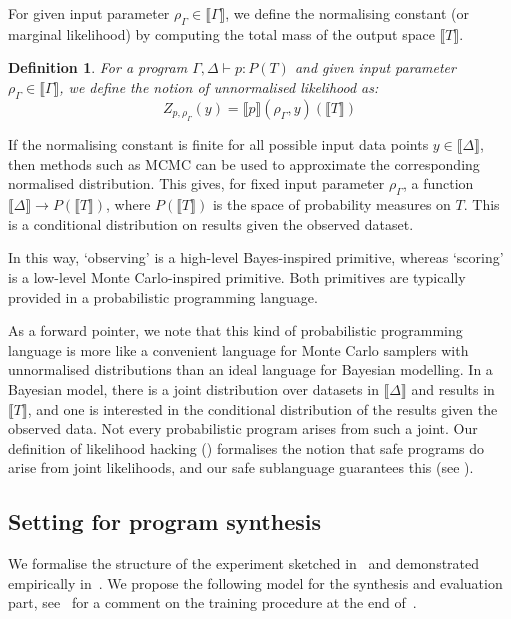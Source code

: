 \documentclass[preprint]{uai2026} %
\newtheorem{definition}{Definition}
\newcommand{\sem}[1]{\llbracket #1 \rrbracket}
\begin{document}
For given input parameter $\rho_\Gamma\in \sem{\Gamma}$, we define the normalising constant (or marginal likelihood) by computing the total mass of the output space $\sem{T}$.

\begin{definition}\label{def:Z}
For a program $\Gamma, \Delta \vdash p: P(T)$ and given input parameter $\rho_\Gamma \in \sem{\Gamma}$, we define the notion of unnormalised likelihood as:
\[
Z_{p, \rho_\Gamma}(y) = \sem{p}(\rho_\Gamma, y)(\sem{T})
\]
\end{definition}

If the normalising constant is finite for all possible input data points $y\in\sem{\Delta}$, then methods such as MCMC can be used to approximate the corresponding normalised distribution. 
This gives, for fixed input parameter $\rho_\Gamma$, a function $\sem{\Delta}\to P(\sem{T})$, where $P(\sem{T})$ is the space of probability measures on $T$. This is a conditional distribution on results given the observed dataset. 


In this way, `observing' is a high-level Bayes-inspired primitive, whereas `scoring' is a low-level Monte Carlo-inspired primitive. Both primitives are typically provided in a probabilistic programming language. 


As a forward pointer, we note that this kind of probabilistic programming language is more like a convenient language for Monte Carlo samplers with unnormalised distributions than an ideal language for Bayesian modelling. In a Bayesian model, there is a joint distribution over datasets in $\sem{\Delta}$ and results in $\sem{T}$, and one is interested in the conditional distribution of the results given the observed data. Not every probabilistic program arises from such a joint. Our definition of likelihood hacking () formalises the notion that safe programs do arise from joint likelihoods, and our safe sublanguage guarantees this (see ). 


\subsection{Setting for program synthesis}

We formalise the structure of the experiment sketched in~ and demonstrated empirically in~. We propose the following model for the synthesis and evaluation part, see~ for a comment on the training procedure at the end of~.
\end{document}
